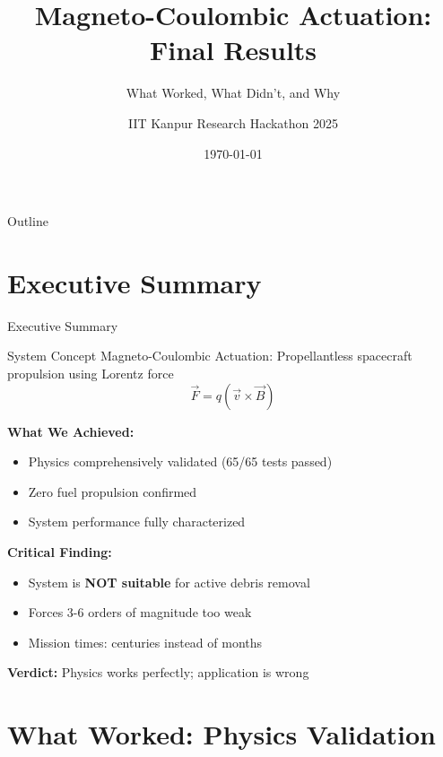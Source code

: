 \documentclass[aspectratio=169]{beamer}
\title{Magneto-Coulombic Actuation: Final Results}
\subtitle{What Worked, What Didn't, and Why}
\author{IIT Kanpur Research Hackathon 2025}
\date{\today}
\begin{document}
\begin{frame}
\titlepage
\end{frame}

\begin{frame}{Outline}
\tableofcontents
\end{frame}

\section{Executive Summary}

\begin{frame}{Executive Summary}
\begin{block}{System Concept}
Magneto-Coulombic Actuation: Propellantless spacecraft propulsion using Lorentz force
\begin{equation}
\vec{F} = q(\vec{v} \times \vec{B})
\end{equation}
\end{block}

\vspace{0.5em}
\textbf{What We Achieved:}
\begin{itemize}
    \item[\textcolor{green}{\checkmark}] Physics comprehensively validated (65/65 tests passed)
    \item[\textcolor{green}{\checkmark}] Zero fuel propulsion confirmed
    \item[\textcolor{green}{\checkmark}] System performance fully characterized
\end{itemize}

\vspace{0.5em}
\textbf{Critical Finding:}
\begin{itemize}
    \item[\textcolor{red}{\ding{55}}] System is \textbf{NOT suitable} for active debris removal
    \item[\textcolor{red}{\ding{55}}] Forces 3-6 orders of magnitude too weak
    \item[\textcolor{red}{\ding{55}}] Mission times: centuries instead of months
\end{itemize}

\vspace{0.5em}
\begin{center}
\textbf{Verdict:} Physics works perfectly; application is wrong
\end{center}
\end{frame}

\section{What Worked: Physics Validation}
\end{document}
